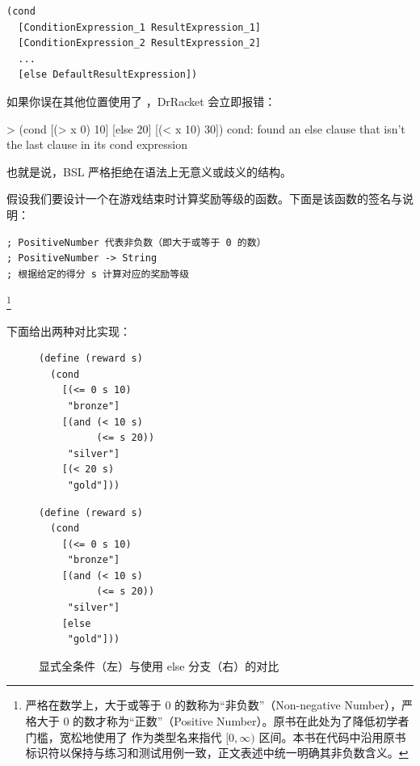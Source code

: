\begin{lstlisting}[language=BSL]
(cond
  [ConditionExpression_1 ResultExpression_1]
  [ConditionExpression_2 ResultExpression_2]
  ...
  [else DefaultResultExpression])
\end{lstlisting}

如果你误在其他位置使用了 ，DrRacket 会立即报错：

\begin{replbox}
> (cond
    [(> x 0) 10]
    [else 20]
    [(< x 10) 30])
cond: found an else clause that isn't the last clause in its cond expression
\end{replbox}

也就是说，BSL 严格拒绝在语法上无意义或歧义的结构。

假设我们要设计一个在游戏结束时计算奖励等级的函数。下面是该函数的签名与说明：

\begin{lstlisting}[language=BSL]
; PositiveNumber 代表非负数（即大于或等于 0 的数）
; PositiveNumber -> String
; 根据给定的得分 s 计算对应的奖励等级
\end{lstlisting}
\footnote{严格在数学上，大于或等于 0 的数称为“非负数”（Non-negative Number），严格大于 0 的数才称为“正数”（Positive Number）。原书在此处为了降低初学者门槛，宽松地使用了  作为类型名来指代 $[0, \infty)$ 区间。本书在代码中沿用原书标识符以保持与练习和测试用例一致，正文表述中统一明确其非负数含义。}

下面给出两种对比实现：

\begin{figure}[htbp]
  \centering
\begin{stepperbox}[unbreakable]
\noindent\begin{minipage}[t]{0.48\linewidth}
\begin{Verbatim}[fontsize=\fontsize{6.0pt}{7.2pt}\selectfont]
(define (reward s)
  (cond
    [(<= 0 s 10)
     "bronze"]
    [(and (< 10 s)
          (<= s 20))
     "silver"]
    [(< 20 s)
     "gold"]))
\end{Verbatim}
\end{minipage}%
\hfill
\begin{minipage}[t]{0.48\linewidth}
\begin{Verbatim}[fontsize=\fontsize{6.0pt}{7.2pt}\selectfont]
(define (reward s)
  (cond
    [(<= 0 s 10)
     "bronze"]
    [(and (< 10 s)
          (<= s 20))
     "silver"]
    [else
     "gold"]))
\end{Verbatim}
\end{minipage}
\end{stepperbox}
  \caption{显式全条件（左）与使用 else 分支（右）的对比}
  \label{fig:reward_compare}
\end{figure}

